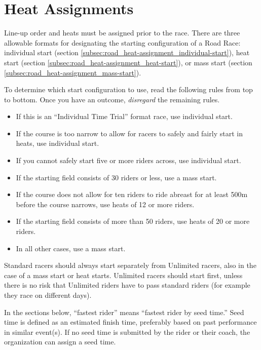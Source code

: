 \section{Heat Assignments}
Line-up order and heats must be assigned prior to the race.
There are three allowable formats for designating the starting configuration of a Road Race: individual start (section \ref{subsec:road_heat-assignment_individual-start}), heat start (section \ref{subsec:road_heat-assignment_heat-start}), or mass start (section \ref{subsec:road_heat-assignment_mass-start}).

To determine which start configuration to use, read the following rules from top to bottom.
Once you have an outcome, \textit{disregard} the remaining rules.
\begin{itemize}
\item If this is an ``Individual Time Trial'' format race, use individual start.
\item If the course is too narrow to allow for racers to safely and fairly start in heats, use individual start.
\item If you cannot safely start five or more riders across, use individual start.
\item If the starting field consists of 30 riders or less, use a mass start.
\item If the course does not allow for ten riders to ride abreast for at least 500m before the course narrows, use heats of 12 or more riders.
\item If the starting field consists of more than 50 riders, use heats of 20 or more riders.
\item In all other cases, use a mass start.
\end{itemize}
Standard racers should always start separately from Unlimited racers, also in the case of a mass start or heat starts.
Unlimited racers should start first, unless there is no risk that Unlimited riders have to pass standard riders (for example they race on different days).

In the sections below, ``fastest rider'' means ``fastest rider by seed time.'' Seed time is defined as an estimated finish time, preferably based on past performance in similar event(s).
If no seed time is submitted by the rider or their coach, the organization can assign a seed time.

